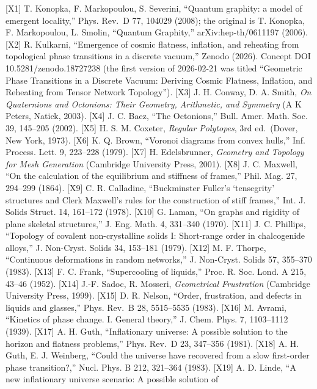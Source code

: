 \documentclass[
  a4paper,
]{article}
\begin{document}
{[}X1{]} T. Konopka, F. Markopoulou, S. Severini, ``Quantum graphity: a
model of emergent locality,'' Phys. Rev.~D 77, 104029 (2008); the
original is T. Konopka, F. Markopoulou, L. Smolin, ``Quantum Graphity,''
arXiv:hep-th/0611197 (2006). {[}X2{]} R. Kulkarni, ``Emergence of cosmic
flatness, inflation, and reheating from topological phase transitions in
a discrete vacuum,'' Zenodo (2026). Concept DOI 10.5281/zenodo.18727238
(the first version of 2026-02-21 was titled ``Geometric Phase
Transitions in a Discrete Vacuum: Deriving Cosmic Flatness, Inflation,
and Reheating from Tensor Network Topology''). {[}X3{]} J. H. Conway, D.
A. Smith, \emph{On Quaternions and Octonions: Their Geometry,
Arithmetic, and Symmetry} (A K Peters, Natick, 2003). {[}X4{]} J. C.
Baez, ``The Octonions,'' Bull. Amer. Math. Soc. 39, 145--205 (2002).
{[}X5{]} H. S. M. Coxeter, \emph{Regular Polytopes}, 3rd ed.~(Dover, New
York, 1973). {[}X6{]} K. Q. Brown, ``Voronoi diagrams from convex
hulls,'' Inf. Process. Lett. 9, 223--228 (1979). {[}X7{]} H.
Edelsbrunner, \emph{Geometry and Topology for Mesh Generation}
(Cambridge University Press, 2001). {[}X8{]} J. C. Maxwell, ``On the
calculation of the equilibrium and stiffness of frames,'' Phil. Mag. 27,
294--299 (1864). {[}X9{]} C. R. Calladine, ``Buckminster Fuller's
`tensegrity' structures and Clerk Maxwell's rules for the construction
of stiff frames,'' Int. J. Solids Struct. 14, 161--172 (1978). {[}X10{]}
G. Laman, ``On graphs and rigidity of plane skeletal structures,'' J.
Eng. Math. 4, 331--340 (1970). {[}X11{]} J. C. Phillips, ``Topology of
covalent non-crystalline solids I: Short-range order in chalcogenide
alloys,'' J. Non-Cryst. Solids 34, 153--181 (1979). {[}X12{]} M. F.
Thorpe, ``Continuous deformations in random networks,'' J. Non-Cryst.
Solids 57, 355--370 (1983). {[}X13{]} F. C. Frank, ``Supercooling of
liquids,'' Proc. R. Soc. Lond. A 215, 43--46 (1952). {[}X14{]} J.-F.
Sadoc, R. Mosseri, \emph{Geometrical Frustration} (Cambridge University
Press, 1999). {[}X15{]} D. R. Nelson, ``Order, frustration, and defects
in liquids and glasses,'' Phys. Rev.~B 28, 5515--5535 (1983). {[}X16{]}
M. Avrami, ``Kinetics of phase change. I. General theory,'' J. Chem.
Phys. 7, 1103--1112 (1939). {[}X17{]} A. H. Guth, ``Inflationary
universe: A possible solution to the horizon and flatness problems,''
Phys. Rev.~D 23, 347--356 (1981). {[}X18{]} A. H. Guth, E. J. Weinberg,
``Could the universe have recovered from a slow first-order phase
transition?,'' Nucl. Phys. B 212, 321--364 (1983). {[}X19{]} A. D.
Linde, ``A new inflationary universe scenario: A possible solution of
\end{document}
